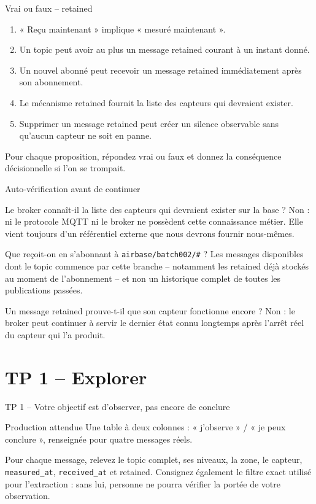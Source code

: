 \documentclass[aspectratio=169]{beamer}
\begin{document}
\begin{frame}{Vrai ou faux -- retained}
\begin{enumerate}
\item « Reçu maintenant » implique « mesuré maintenant ».
\item Un topic peut avoir au plus un message retained courant à un instant donné.
\item Un nouvel abonné peut recevoir un message retained immédiatement après son abonnement.
\item Le mécanisme retained fournit la liste des capteurs qui devraient exister.
\item Supprimer un message retained peut créer un silence observable sans qu'aucun capteur ne soit en panne.
\end{enumerate}
Pour chaque proposition, répondez vrai ou faux et donnez la conséquence décisionnelle si l'on se trompait.
\end{frame}

\begin{frame}{Auto-vérification avant de continuer}
\small
\begin{block}{Le broker connaît-il la liste des capteurs qui devraient exister sur la base ?}
Non : ni le protocole MQTT ni le broker ne possèdent cette connaissance métier. Elle vient toujours d'un référentiel externe que nous devrons fournir nous-mêmes.
\end{block}
\begin{block}{Que reçoit-on en s'abonnant à \texttt{airbase/batch002/\#} ?}
Les messages disponibles dont le topic commence par cette branche -- notamment les retained déjà stockés au moment de l'abonnement -- et non un historique complet de toutes les publications passées.
\end{block}
\begin{block}{Un message retained prouve-t-il que son capteur fonctionne encore ?}
Non : le broker peut continuer à servir le dernier état connu longtemps après l'arrêt réel du capteur qui l'a produit.
\end{block}
\end{frame}

\section{TP 1 -- Explorer}
\begin{frame}{TP 1 -- Votre objectif est d'observer, pas encore de conclure}
\begin{block}{Production attendue}
Une table à deux colonnes : « j'observe » / « je peux conclure », renseignée pour quatre messages réels.
\end{block}
Pour chaque message, relevez le topic complet, ses niveaux, la zone, le capteur, \texttt{measured\_at}, \texttt{received\_at} et retained. Consignez également le filtre exact utilisé pour l'extraction : sans lui, personne ne pourra vérifier la portée de votre observation.
\end{frame}
\end{document}

